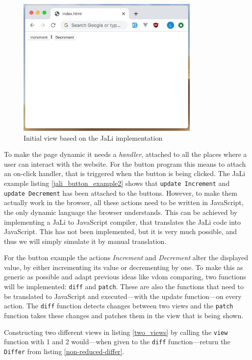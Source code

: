 \begin{figure}
    \centering
    \includegraphics[width=0.8\textwidth]{./images/jali-button-in-browser}
    \caption{Initial view based on the JaLi implementation}
    \label{fig:jali-button-in-browser}
\end{figure}

To make the page dynamic it needs a \textit{handler}, attached to all the places where a user can interact with the website. For the button program this means to attach an on-click handler, that is triggered when the button is being clicked. The JaLi example listing \ref{jali_button_example2} shows that \texttt{update Increment} and \texttt{update Decrement} has been attached to the buttons. However, to make them actually work in the browser, all these actions need to be written in JavaScript, the only dynamic language the browser understands. This can be achieved by implementing a JaLi to JavaScript compiler, that translates the JaLi code into JavaScript. This has not been implemented, but it is very much possible, and thus we will simply simulate it by manual translation.

For the button example the actions \textit{Increment} and \textit{Decrement} alter the displayed value, by either incrementing its value or decrementing by one.
To make this as generic as possible and adapt previous ideas like \gls{vdom} comparing, two functions will be implemented: \texttt{diff} and \texttt{patch}. These are also the functions that need to be translated to JavaScript and executed---with the update function---on every action.
The \texttt{diff} function detects changes between two views and the \texttt{patch} function takes these changes and patches them in the view that is being shown.

Constructing two different views in listing \ref{two_views} by calling the \texttt{view} function with 1 and 2 would---when given to the \texttt{diff} function---return the \texttt{Differ} from listing \ref{non-reduced-differ}.

